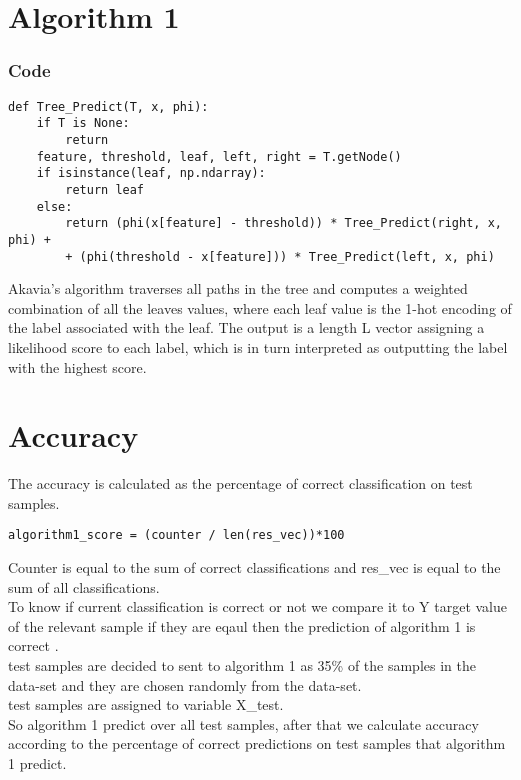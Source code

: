 \documentclass{article}
\begin{document}
\section{Algorithm 1}
\subsubsection{Code}
\begin{lstlisting}
def Tree_Predict(T, x, phi):
    if T is None:
        return
    feature, threshold, leaf, left, right = T.getNode()
    if isinstance(leaf, np.ndarray):
        return leaf
    else:
        return (phi(x[feature] - threshold)) * Tree_Predict(right, x, phi) + 
        + (phi(threshold - x[feature])) * Tree_Predict(left, x, phi)
\end{lstlisting}


Akavia's algorithm traverses all paths in the tree and computes a weighted combination of
all the leaves values, where each leaf value is the 1-hot encoding of the
label associated with the leaf. The output is a length L vector assigning a
likelihood score to each label, which is in turn interpreted as outputting
the label with the highest score.\\



\section{Accuracy}

The accuracy is calculated as the percentage of correct classification on test samples. \\
\begin{lstlisting}
algorithm1_score = (counter / len(res_vec))*100 
\end{lstlisting}

Counter is equal to the sum of correct classifications and res\_vec is equal to the sum of all classifications.\\ 
To know if current classification is correct or not we compare it to Y target value of the relevant sample if they are eqaul then the prediction of algorithm 1 is correct . \\

test samples are decided to sent to algorithm 1 as 35\% of the samples in the data-set and they are chosen randomly from the data-set.\\
test samples are assigned to variable X\_test. \\
So algorithm 1 predict over all test samples, after that we calculate accuracy according to the percentage of correct predictions on test samples that algorithm 1 predict.\\
\end{document}
